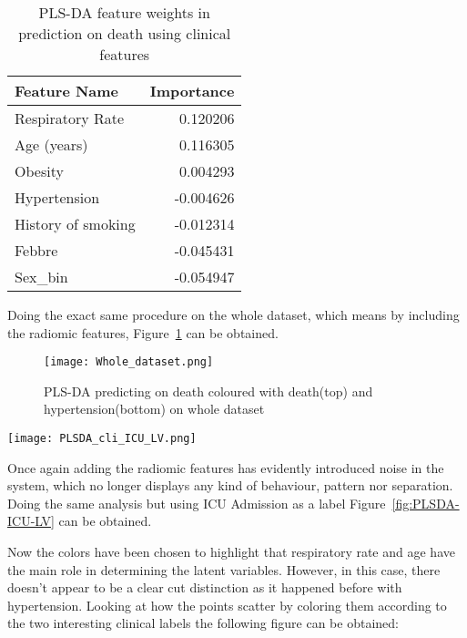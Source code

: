 \begin{table}
\caption{PLS-DA feature weights in prediction on death using clinical features}
\centering
	\begin{tabular}{|l|r|}
	\hline
	Feature Name &         Importance \\
	\hline
	 Respiratory Rate &  0.120206 \\
	 Age (years) &  0.116305 \\
	 Obesity &  0.004293 \\
	 Hypertension & -0.004626 \\
	 History of smoking & -0.012314 \\
	 Febbre & -0.045431 \\
	 Sex\_bin & -0.054947 \\
	\hline
	\end{tabular}
\end{table}

Doing the exact same procedure on the whole dataset, which means by including the radiomic features, Figure~\ref{fig:whole_dataset} can be obtained.

\begin{figure}[htbp]
  		\texttt{[image: Whole\_dataset.png]}
          \caption{PLS-DA predicting on death coloured with death(top) and hypertension(bottom) on whole dataset\label{fig:whole_dataset}}
\end{figure}



\begin{figure*}[htbp]
  		\texttt{[image: PLSDA\_cli\_ICU\_LV.png]}
          \caption{PLS-DA predicting on death coloured with Age and respiratory rate on clinical features\label{fig:PLSDA-ICU-LV}}
\end{figure*}

Once again adding the radiomic features has evidently introduced noise in the system, which no longer displays any kind of behaviour, pattern nor separation.
Doing the same analysis but using ICU Admission as a label Figure~\ref{fig:PLSDA-ICU-LV} can be obtained. 

Now the colors have been chosen to highlight that respiratory rate and age have the main role in determining the latent variables. However, in this case, there doesn't appear to be a clear cut distinction as it happened before with hypertension.
Looking at how the points scatter by coloring them according to the two interesting clinical labels the following figure can be obtained:


